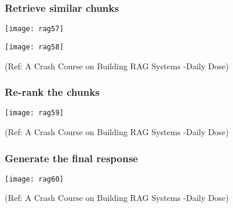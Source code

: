 \begin{frame}[fragile]\frametitle{Retrieve similar chunks}



		\begin{center}
		\texttt{[image: rag57]}
		
		\texttt{[image: rag58]}
		
		\end{center}

{\tiny (Ref: A Crash Course on Building RAG Systems -Daily Dose)}


\end{frame}

\begin{frame}[fragile]\frametitle{Re-rank the chunks}



		\begin{center}
		\texttt{[image: rag59]}
		
	
		\end{center}

{\tiny (Ref: A Crash Course on Building RAG Systems -Daily Dose)}


\end{frame}

\begin{frame}[fragile]\frametitle{Generate the final response}



		\begin{center}
		\texttt{[image: rag60]}
		
	
		\end{center}

{\tiny (Ref: A Crash Course on Building RAG Systems -Daily Dose)}


\end{frame}





		
